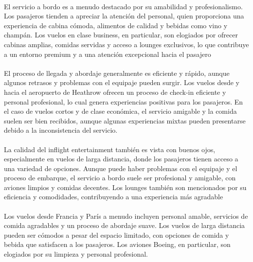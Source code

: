 \documentclass{report}
\begin{document}
                    \paragraph*{}{
                        El servicio a bordo es a menudo destacado por su amabilidad y profesionalismo. Los pasajeros tienden a apreciar la atención del personal, quien proporciona una experiencia de cabina cómoda, alimentos de calidad y bebidas como vino y champán. Los vuelos en clase business, en particular, son elogiados por ofrecer cabinas amplias, comidas servidas y acceso a lounges exclusivos, lo que contribuye a un entorno premium y a una atención excepcional hacia el pasajero
                    }
                    \paragraph*{}{
                        El proceso de llegada y abordaje generalmente es eficiente y rápido, aunque algunos retrasos y problemas con el equipaje pueden surgir. Los vuelos desde y hacia el aeropuerto de Heathrow ofrecen un proceso de check-in eficiente y personal profesional, lo cual genera experiencias positivas para los pasajeros. En el caso de vuelos cortos y de clase económica, el servicio amigable y la comida suelen ser bien recibidos, aunque algunas experiencias mixtas pueden presentarse debido a la inconsistencia del servicio.
                    }
                    \paragraph*{}{
                        La calidad del inflight entertainment también es vista con buenos ojos, especialmente en vuelos de larga distancia, donde los pasajeros tienen acceso a una variedad de opciones. Aunque puede haber problemas con el equipaje y el proceso de embarque, el servicio a bordo suele ser profesional y amigable, con aviones limpios y comidas decentes. Los lounges también son mencionados por su eficiencia y comodidades, contribuyendo a una experiencia más agradable
                    }
                    \paragraph*{}{
                        Los vuelos desde Francia y París a menudo incluyen personal amable, servicios de comida agradables y un proceso de abordaje suave. Los vuelos de larga distancia pueden ser cómodos a pesar del espacio limitado, con opciones de comida y bebida que satisfacen a los pasajeros. Los aviones Boeing, en particular, son elogiados por su limpieza y personal profesional.
                    }
\end{document}
